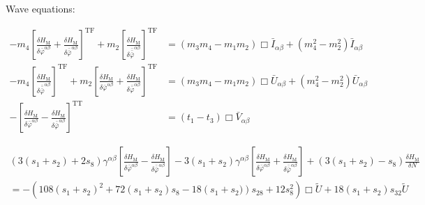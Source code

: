 \documentclass[11pt]{article}
\begin{document}
\begin{landscape}

Wave equations:

\begin{align}
	-m_4 
	\left[ 
		\frac{
			\delta H_{\text{M}}
		}{
			\delta \bar{\varphi}^{\alpha \beta}
		}
		+
		\frac{
			\delta H_{\text{M}}
		}{
			\delta \bar{\bar{\varphi}}^{\alpha \beta}
		}
	\right]^{\text{TF}} 
	+ m_2 
	\left[ 
		\frac{
			\delta H_{\text{M}}
		}{
			\delta \bar{\bar{\bar{\varphi}}}^{\alpha \beta}
		}
	\right]^{\text{TF}} 
	&=
	\left( 
		m_3 m_4 - m_1 m_2 
	\right)
	\Box \bar{I}_{\alpha \beta}
	+ 
	\left( 
		m_4^2 - m_2^2 
	\right)
	\bar I_{\alpha \beta}
	\label{w_eq_I}
	\\
	-m_4 
	\left[ 
		\frac{
			\delta H_{\text{M}}
		}{
			\delta \bar{\bar{\bar{\varphi}}}^{\alpha \beta}
		}
	\right]^{\text{TF}}
	+ m_2
	\left[ 
		\frac{
			\delta H_{\text{M}}
		}{
			\delta \bar{\varphi}^{\alpha \beta}
		}
		+
		\frac{
			\delta H_{\text{M}}
		}{
			\delta \bar{\bar{\varphi}}^{\alpha \beta}
		}
	\right]^{\text{TF}}   
	&=
	\left( 
		m_3 m_4 - m_1 m_2 
	\right)
	\Box \bar{U}_{\alpha \beta}
	+ 
	\left( 
		m_4^2 - m_2^2 
	\right)
	\bar U_{\alpha \beta}
	\label{w_eq_U}
	\\
	-
	\left[ 
		\frac{
			\delta H_{\text{M}}
		}{
			\delta \bar{\varphi}^{\alpha \beta}
		}
		-
		\frac{
			\delta H_{\text{M}}
		}{
			\delta \bar{\bar{\varphi}}^{\alpha \beta}
		}
	\right]^{\text{TT}} 
	&=
	\left( 
		t_1 - t_3
	\right)
	\Box \bar{V}_{\alpha \beta}
	\label{w_eq_V}
\end{align}

\begin{multline}
	\left(
		3 \left( s_1 + s_2\right) + 2 s_8
	\right)
	\gamma^{\alpha \beta}
	\left[ 
		\frac{
			\delta H_{\text{M}}
		}{
			\delta \bar{\varphi}^{\alpha \beta}
		}
		-
		\frac{
			\delta H_{\text{M}}
		}{
			\delta \bar{\bar{\varphi}}^{\alpha \beta}
		}
	\right]
	-
	3 \left(s_1 + s_2 \right) 
	\gamma^{\alpha \beta}
	\left[ 
		\frac{
			\delta H_{\text{M}}
		}{
			\delta \bar{\varphi}^{\alpha \beta}
		}
		+
		\frac{
			\delta H_{\text{M}}
		}{
			\delta \bar{\bar{\varphi}}^{\alpha \beta}
		}
	\right]
	+
	\left(
		3 \left(s_1 + s_2 \right) - s_8
	\right)
	\frac{\delta H_{\text{M}}}{\delta N}
	\\
	=
	- \left(
	108 \left(s_1 + s_2 \right)^2
	+ 72 \left(s_1 + s_2 \right) s_8
	- 18 \left(s_1 + s_2)\right) s_{28}
	+ 12 s_8^2
	\right)
	\Box \tilde{U}
	+ 
	18 \left( s_1 + s_2\right) s_{32} \tilde{U}
	\label{w_eq_Us}
\end{multline}
	

\end{landscape}
\end{document}
